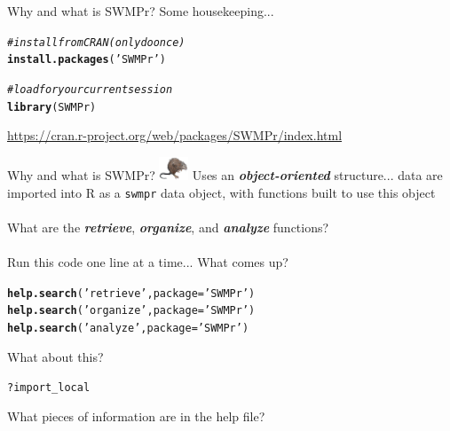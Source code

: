 \documentclass[xcolor=dvipsnames]{beamer}\usepackage[]{graphicx}\usepackage[]{color}
\makeatletter
\newcommand{\hlstr}[1]{\textcolor[rgb]{0.192,0.494,0.8}{#1}}%
\newcommand{\hlcom}[1]{\textcolor[rgb]{0.678,0.584,0.686}{\textit{#1}}}%
\newcommand{\hlopt}[1]{\textcolor[rgb]{0,0,0}{#1}}%
\newcommand{\hlstd}[1]{\textcolor[rgb]{0.345,0.345,0.345}{#1}}%
\newcommand{\hlkwc}[1]{\textcolor[rgb]{0.333,0.667,0.333}{#1}}%
\newcommand{\hlkwd}[1]{\textcolor[rgb]{0.737,0.353,0.396}{\textbf{#1}}}%
\newenvironment{kframe}{%
 \def\at@end@of@kframe{}%
 \ifinner\ifhmode%
  \def\at@end@of@kframe{\end{minipage}}%
  \begin{minipage}{\columnwidth}%
 \fi\fi%
 \def\FrameCommand##1{\hskip\@totalleftmargin \hskip-\fboxsep
 \colorbox{shadecolor}{##1}\hskip-\fboxsep
     \hskip-\linewidth \hskip-\@totalleftmargin \hskip\columnwidth}%
 \MakeFramed {\advance\hsize-\width
   \@totalleftmargin\z@ \linewidth\hsize
   \@setminipage}}%
 {\par\unskip\endMakeFramed%
 \at@end@of@kframe}
\newenvironment{knitrout}{}{} %
\newcommand{\Bigtxt}[1]{\textbf{\textit{#1}}}
\makeatother
\begin{document}
\begin{frame}[fragile]{Why and what is SWMPr?}
Some housekeeping...
\begin{knitrout}\scriptsize
{}\color{fgcolor}\begin{kframe}
\begin{alltt}
\hlcom{# install from CRAN (only do once)}
\hlkwd{install.packages}\hlstd{(}\hlstr{'SWMPr'}\hlstd{)}

\hlcom{# load for your current session}
\hlkwd{library}\hlstd{(SWMPr)}
\end{alltt}
\end{kframe}
\end{knitrout}
\url{https://cran.r-project.org/web/packages/SWMPr/index.html}
\end{frame}

\begin{frame}[fragile]{Why and what is SWMPr? \includegraphics[width = 0.065\textwidth]{imgs/swmprat.png}}
\onslide<+->
Uses an \Bigtxt{object-oriented} structure... data are imported into R as a \texttt{swmpr} data object, with functions built to use this object\\~\\
What are the \Bigtxt{retrieve}, \Bigtxt{organize}, and \Bigtxt{analyze} functions? \\~\\
Run this code one line at a time... What comes up?
\begin{knitrout}\scriptsize
{}\color{fgcolor}\begin{kframe}
\begin{alltt}
\hlkwd{help.search}\hlstd{(}\hlstr{'retrieve'}\hlstd{,} \hlkwc{package} \hlstd{=} \hlstr{'SWMPr'}\hlstd{)}
\hlkwd{help.search}\hlstd{(}\hlstr{'organize'}\hlstd{,} \hlkwc{package} \hlstd{=} \hlstr{'SWMPr'}\hlstd{)}
\hlkwd{help.search}\hlstd{(}\hlstr{'analyze'}\hlstd{,} \hlkwc{package} \hlstd{=} \hlstr{'SWMPr'}\hlstd{)}
\end{alltt}
\end{kframe}
\end{knitrout}
\onslide<+->
What about this?
\begin{knitrout}\scriptsize
{}\color{fgcolor}\begin{kframe}
\begin{alltt}
\hlopt{?}\hlstd{import_local}
\end{alltt}
\end{kframe}
\end{knitrout}
What pieces of information are in the help file?
\end{frame}
\end{document}
